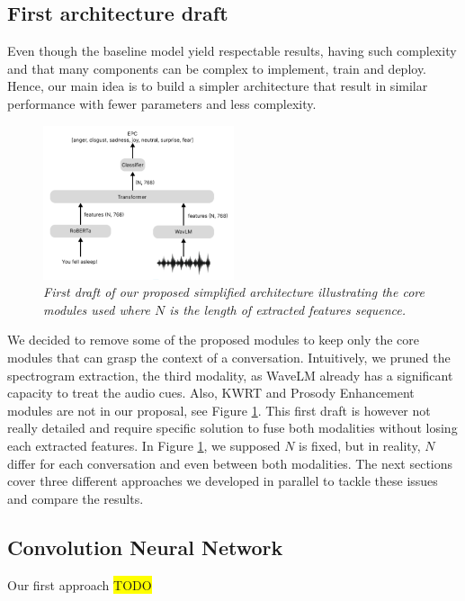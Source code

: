 \documentclass{article}
\begin{document}
\subsection{First architecture draft}
Even though the baseline model yield respectable results, having such complexity and that many components can be complex to implement, train and deploy. Hence, our main idea is to build a simpler architecture that result in similar performance with fewer parameters and less complexity.

\begin{figure}[htbp]
  \centering
  \includegraphics[width=0.5\textwidth]{Images/architecture_draft.png}
  \caption{\textit{First draft of our proposed simplified architecture illustrating the core modules used where $N$ is the length of extracted features sequence.}}
  \label{fig:DraftArchitecture}
\end{figure}

We decided to remove some of the proposed modules to keep only the core modules that can grasp the context of a conversation. Intuitively, we pruned the spectrogram extraction, the third modality, as WaveLM already has a significant capacity to treat the audio cues.
Also, KWRT and Prosody Enhancement modules are not in our proposal, see Figure \ref{fig:DraftArchitecture}. This first draft is however not really detailed and require specific solution to fuse both modalities without losing each extracted features. In Figure \ref{fig:DraftArchitecture}, we supposed $N$ is fixed, but in reality, $N$ differ for each conversation and even between both modalities. The next sections cover three different approaches we developed in parallel to tackle these issues and compare the results.


\subsection{Convolution Neural Network}
Our first approach
\colorbox{yellow}{TODO}\\
\end{document}
